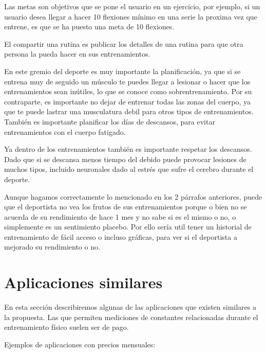 Las metas son objetivos que se pone el usuario en un ejercicio, por ejemplo, si un usuario desea llegar a hacer 10 flexiones mínimo en una serie la proxima vez que entrene, es que se ha puesto una meta de 10 flexiones.

El compartir una rutina es publicar los detalles de una rutina para que otra persona la pueda hacer en sus entrenamientos.

En este gremio del deporte es muy importante la planificación, ya que si se entrena muy de seguido un músculo te puedes llegar a lesionar o hacer que los entrenamientos sean inútiles, lo que se conoce como sobrentrenamiento. Por su contraparte, es importante no dejar de entrenar todas las zonas del cuerpo, ya que te puede lastrar una musculatura debil para otros tipos de entrenamientos. También es importante planificar los días de descansos, para evitar entrenamientos con el cuerpo fatigado. 

Ya dentro de los entrenamientos también es importante respetar los descansos. Dado que si se descansa menos tiempo del debido puede provocar lesiones de muchos tipos, incluido neuronales dado al estrés que sufre el cerebro durante el deporte.

Aunque hagamos correctamente lo mencionado en los 2 párrafos anteriores, puede que el deportista no vea los frutos de sus entrenamientos porque o bien no se acuerda de su rendimiento de hace 1 mes y no sabe si es el mismo o no, o simplemente es un sentimiento placebo. Por ello sería util tener un historial de entrenamiento de fácil acceso o incluso gráficas, para ver si el deportista a mejorado su rendimiento o no.

\section{Aplicaciones similares}

En esta sección describiremos algunas de las aplicaciones que existen similares a la propuesta. Las que permiten mediciones de constantes relacionadas durante el entrenamiento físico suelen ser de pago.

Ejemplos de aplicaciones con precios mensuales:

